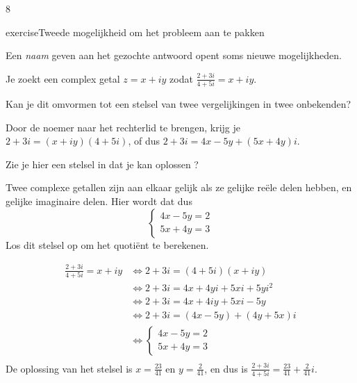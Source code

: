8\documentclass{ximera}
\begin{document}
{    \begin{expandable}{exercise}{Tweede mogelijkheid om het probleem aan te pakken}
        
        Een \textit{naam} geven aan het gezochte antwoord opent soms nieuwe mogelijkheden.

        \begin{hint} Je zoekt een complex getal $z=x+iy$ zodat 
            $
            \frac{2+3i}{4+5i} = x+iy
            $.

            Kan je dit omvormen tot een stelsel van twee vergelijkingen in twee onbekenden?
        \end{hint}
        \begin{hint} Door de noemer naar het rechterlid te brengen, krijg je
            $2+3i = (x+iy)(4+5i)$, of dus $2+3i = 4x-5y + (5x+4y)i$.

            Zie je hier een stelsel in dat je kan oplossen ?
        \end{hint}
        \begin{hint} Twee complexe getallen zijn aan elkaar gelijk als ze gelijke reële delen hebben, en gelijke imaginaire delen.
            Hier wordt dat dus
                $$
                \begin{cases}
                    4x - 5y = 2   \\
                    5x + 4y = 3
                \end{cases}
                $$
                Los dit stelsel op om het quotiënt te berekenen.
            \end{hint}
        \begin{oplossing}
                \begin{align*}
                   \frac{2+3i}{4+5i} = x+iy & \iff 2+3i = (4+5i)(x+iy) \\
                                            & \iff 2+3i = 4x+4yi + 5xi + 5yi^2  \\
                                            & \iff 2+3i = 4x+4iy + 5xi - 5y  \\
                                            & \iff 2+3i = (4x - 5y) + (4y + 5x)i   \\
                                            & \iff \begin{cases}
                                                 4x - 5y = 2   \\
                                                 5x + 4y = 3
                                                    \end{cases} \\
                \end{align*}
                De oplossing van het stelsel is $x=\frac{23}{41}$ en $y=\frac{2}{41}$, en dus is 
                $
                \frac{2+3i}{4+5i} = \frac{23}{41} + \frac{2}{41}i
                $.


\end{oplossing}
\end{expandable}}
\end{document}
